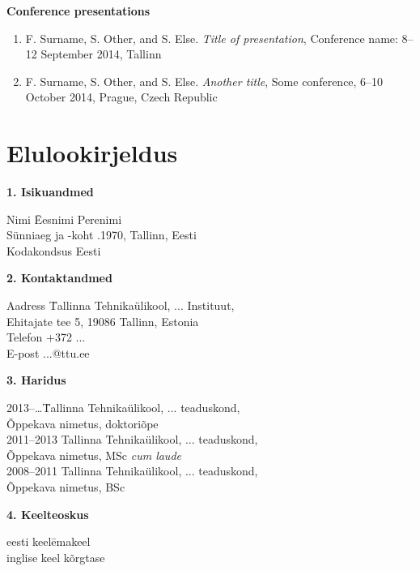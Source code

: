 \textbf{Conference presentations}
\begin{enumerate}
  \item F. Surname, S. Other, and S. Else. \textit{Title of presentation}, Conference name: 8--12 September 2014, Tallinn
  \item F. Surname, S. Other, and S. Else. \textit{Another title}, Some conference, 6--10 October 2014, Prague, Czech Republic
\end{enumerate}

\newpage
\section*{Elulookirjeldus}
\textbf{1. Isikuandmed}

\begin{tabbing}
Nimi 	\quad\quad\quad\quad\quad\quad\quad\quad\quad 	\=Eesnimi Perenimi \\
S\"unniaeg ja -koht .1970, Tallinn, Eesti\\
Kodakondsus \> Eesti
\end{tabbing}

\textbf{2. Kontaktandmed}
\begin{tabbing}
Aadress	\quad\quad 	\= Tallinna  Tehnika\"ulikool, ... Instituut, \\
                        \> Ehitajate tee 5, 19086 Tallinn, Estonia \\
                        Telefon \> +372 ...\\
                        E-post\> ...@ttu.ee
\end{tabbing}

\textbf{3. Haridus}
\begin{tabbing}
2013--\ldots \quad \quad \=Tallinna Tehnika\"ulikool, ... teaduskond,\\ 
       \>Õppekava nimetus, doktori\~ope \\
2011--2013	 	\>Tallinna Tehnika\"ulikool, ... teaduskond,\\
                        \>Õppekava nimetus, MSc \textit{cum laude}\\
2008--2011	 	\>Tallinna Tehnika\"ulikool, ... teaduskond,\\
                        \>Õppekava nimetus, BSc\\
\end{tabbing}

\textbf{4. Keelteoskus}
\begin{tabbing}
eesti keel\quad\quad\quad \= emakeel\\
inglise keel	 	\>k\~orgtase\\
\end{tabbing}


